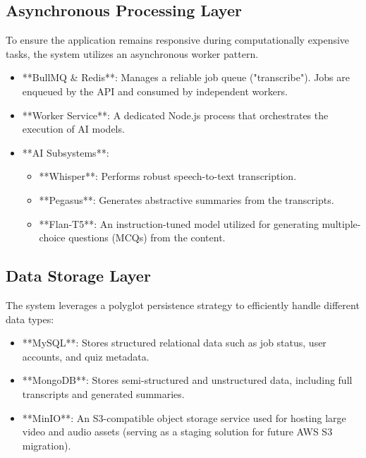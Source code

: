 \subsection{Asynchronous Processing Layer}
To ensure the application remains responsive during computationally expensive tasks, the system utilizes an asynchronous worker pattern.
\begin{itemize}
    \item **BullMQ & Redis**: Manages a reliable job queue ("transcribe"). Jobs are enqueued by the API and consumed by independent workers.
    \item **Worker Service**: A dedicated Node.js process that orchestrates the execution of AI models.
    \item **AI Subsystems**:
        \begin{itemize}
            \item **Whisper**: Performs robust speech-to-text transcription.
            \item **Pegasus**: Generates abstractive summaries from the transcripts.
            \item **Flan-T5**: An instruction-tuned model utilized for generating multiple-choice questions (MCQs) from the content.
        \end{itemize}
\end{itemize}

\subsection{Data Storage Layer}
The system leverages a polyglot persistence strategy to efficiently handle different data types:
\begin{itemize}
    \item **MySQL**: Stores structured relational data such as job status, user accounts, and quiz metadata.
    \item **MongoDB**: Stores semi-structured and unstructured data, including full transcripts and generated summaries.
    \item **MinIO**: An S3-compatible object storage service used for hosting large video and audio assets (serving as a staging solution for future AWS S3 migration).
\end{itemize}
